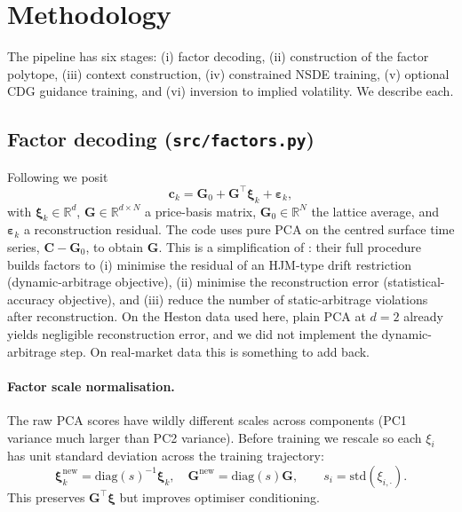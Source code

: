 \documentclass[11pt]{article}
\newcommand{\R}{\mathbb{R}}
\newcommand{\xib}{\boldsymbol{\xi}}
\newcommand{\1}{\mathbf{1}}
\begin{document}
\section{Methodology}

The pipeline has six stages: (i) factor decoding, (ii) construction of the factor polytope, (iii) context construction, (iv) constrained NSDE training, (v) optional CDG guidance training, and (vi) inversion to implied volatility. We describe each.

\subsection{Factor decoding (\texttt{src/factors.py})}

Following \citet[\S 2.2]{cohen2021} we posit
\begin{equation}
\mathbf c_k = \mathbf G_0 + \mathbf G^\top \xib_k + \boldsymbol\varepsilon_k,
\label{eq:factor}
\end{equation}
with $\xib_k \in \R^d$, $\mathbf G \in \R^{d \times N}$ a price-basis matrix, $\mathbf G_0 \in \R^N$ the lattice average, and $\boldsymbol\varepsilon_k$ a reconstruction residual. The code uses pure PCA on the centred surface time series, $\mathbf C - \mathbf G_0$, to obtain $\mathbf G$. This is a simplification of \citet[Algorithm 1]{cohen2021}: their full procedure builds factors to (i) minimise the residual of an HJM-type drift restriction (dynamic-arbitrage objective), (ii) minimise the reconstruction error (statistical-accuracy objective), and (iii) reduce the number of static-arbitrage violations after reconstruction. On the Heston data used here, plain PCA at $d = 2$ already yields negligible reconstruction error, and we did not implement the dynamic-arbitrage step. On real-market data this is something to add back.

\paragraph{Factor scale normalisation.}
The raw PCA scores have wildly different scales across components (PC1 variance much larger than PC2 variance). Before training we rescale so each $\xi_i$ has unit standard deviation across the training trajectory:
\begin{equation}
\xib_k^{\text{new}} = \mathrm{diag}(s)^{-1} \xib_k, \quad \mathbf G^{\text{new}} = \mathrm{diag}(s) \mathbf G, \qquad s_i = \mathrm{std}(\xi_{i, \cdot}).
\end{equation}
This preserves $\mathbf G^\top \xib$ but improves optimiser conditioning.
\end{document}
